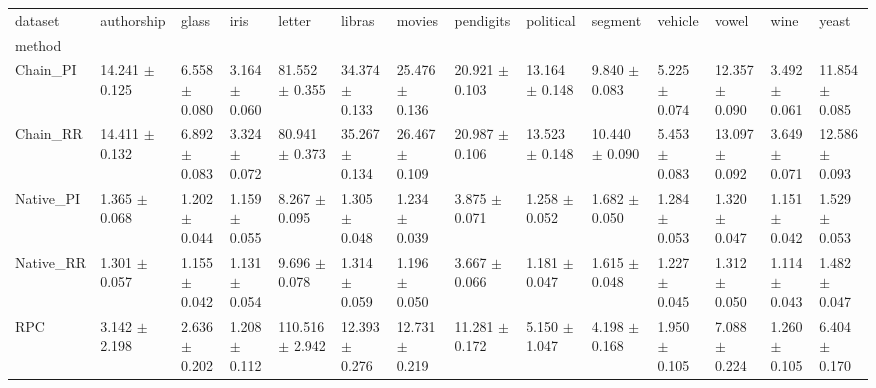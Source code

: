 \begin{tabular}{llllllllllllll}
\toprule
dataset &            authorship &                glass &                 iris &                 letter &                libras &                movies &             pendigits &             political &               segment &              vehicle &                 vowel &                 wine &                 yeast \\
method    &                       &                      &                      &                        &                       &                       &                       &                       &                       &                      &                       &                      &                       \\
\midrule
Chain_PI  &  14.241 $ \pm $ 0.125 &  6.558 $ \pm $ 0.080 &  3.164 $ \pm $ 0.060 &   81.552 $ \pm $ 0.355 &  34.374 $ \pm $ 0.133 &  25.476 $ \pm $ 0.136 &  20.921 $ \pm $ 0.103 &  13.164 $ \pm $ 0.148 &   9.840 $ \pm $ 0.083 &  5.225 $ \pm $ 0.074 &  12.357 $ \pm $ 0.090 &  3.492 $ \pm $ 0.061 &  11.854 $ \pm $ 0.085 \\
Chain_RR  &  14.411 $ \pm $ 0.132 &  6.892 $ \pm $ 0.083 &  3.324 $ \pm $ 0.072 &   80.941 $ \pm $ 0.373 &  35.267 $ \pm $ 0.134 &  26.467 $ \pm $ 0.109 &  20.987 $ \pm $ 0.106 &  13.523 $ \pm $ 0.148 &  10.440 $ \pm $ 0.090 &  5.453 $ \pm $ 0.083 &  13.097 $ \pm $ 0.092 &  3.649 $ \pm $ 0.071 &  12.586 $ \pm $ 0.093 \\
Native_PI &   1.365 $ \pm $ 0.068 &  1.202 $ \pm $ 0.044 &  1.159 $ \pm $ 0.055 &    8.267 $ \pm $ 0.095 &   1.305 $ \pm $ 0.048 &   1.234 $ \pm $ 0.039 &   3.875 $ \pm $ 0.071 &   1.258 $ \pm $ 0.052 &   1.682 $ \pm $ 0.050 &  1.284 $ \pm $ 0.053 &   1.320 $ \pm $ 0.047 &  1.151 $ \pm $ 0.042 &   1.529 $ \pm $ 0.053 \\
Native_RR &   1.301 $ \pm $ 0.057 &  1.155 $ \pm $ 0.042 &  1.131 $ \pm $ 0.054 &    9.696 $ \pm $ 0.078 &   1.314 $ \pm $ 0.059 &   1.196 $ \pm $ 0.050 &   3.667 $ \pm $ 0.066 &   1.181 $ \pm $ 0.047 &   1.615 $ \pm $ 0.048 &  1.227 $ \pm $ 0.045 &   1.312 $ \pm $ 0.050 &  1.114 $ \pm $ 0.043 &   1.482 $ \pm $ 0.047 \\
RPC       &   3.142 $ \pm $ 2.198 &  2.636 $ \pm $ 0.202 &  1.208 $ \pm $ 0.112 &  110.516 $ \pm $ 2.942 &  12.393 $ \pm $ 0.276 &  12.731 $ \pm $ 0.219 &  11.281 $ \pm $ 0.172 &   5.150 $ \pm $ 1.047 &   4.198 $ \pm $ 0.168 &  1.950 $ \pm $ 0.105 &   7.088 $ \pm $ 0.224 &  1.260 $ \pm $ 0.105 &   6.404 $ \pm $ 0.170 \\

\end{tabular}
